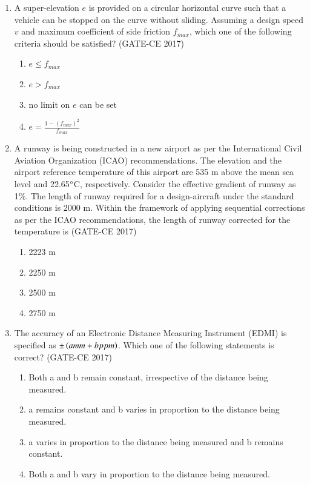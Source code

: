 \documentclass[journal,12pt,onecolumn]{article}
\theoremstyle{remark}
\begin{document}
\begin{enumerate}
    \item A super-elevation $e$ is provided on a circular horizontal curve such that a vehicle can be stopped on the curve without sliding. Assuming a design speed $v$ and maximum coefficient of side friction $f_{max}$, which one of the following criteria should be satisfied? \hfill (GATE-CE 2017)
    \begin{multicols}{2}
    \begin{enumerate}
        \item $e \leq f_{max}$
        \item $e > f_{max}$
        \item no limit on $e$ can be set
        \item $e = \frac{1 - (f_{max})^2}{f_{max}}$
    \end{enumerate}
    \end{multicols}

    \item A runway is being constructed in a new airport as per the International Civil Aviation Organization (ICAO) recommendations. The elevation and the airport reference temperature of this airport are 535 m above the mean sea level and 22.65$\degree$C, respectively. Consider the effective gradient of runway as 1\%. The length of runway required for a design-aircraft under the standard conditions is 2000 m. Within the framework of applying sequential corrections as per the ICAO recommendations, the length of runway corrected for the temperature is \hfill (GATE-CE 2017)
    \begin{multicols}{4}
    \begin{enumerate}
        \item 2223 m
        \item 2250 m
        \item 2500 m
        \item 2750 m
    \end{enumerate}
    \end{multicols}

    \item The accuracy of an Electronic Distance Measuring Instrument (EDMI) is specified as $\pm \left(a mm + b ppm\right)$. Which one of the following statements is correct? \hfill (GATE-CE 2017)
    \begin{enumerate}
        \item Both a and b remain constant, irrespective of the distance being measured.
        \item a remains constant and b varies in proportion to the distance being measured.
        \item a varies in proportion to the distance being measured and b remains constant.
        \item Both a and b vary in proportion to the distance being measured.
    \end{enumerate}


\end{enumerate}
\end{document}
